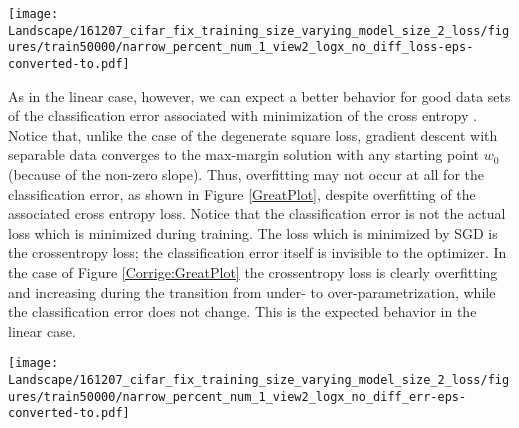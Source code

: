 \documentclass[10pt]{article}
\begin{document}
\begin{figure*}[h!]\centering
\texttt{[image: Landscape/161207\_cifar\_fix\_training\_size\_varying\_model\_size\_2\_loss/figures/train50000/narrow\_percent\_num\_1\_view2\_logx\_no\_diff\_loss-eps-converted-to.pdf]}
\caption{\it The previous figures show dependence on $n$ -- number of
  training examples -- for a fixed ReLU architecture with $W$
  parameters.  This figure shows dependence on $W$ of the
  cross entropy loss for a fixed training set of $n$ examples. The
  network is again a 5-layer all convolutional network (i.e., no
  pooling) with ReLUs. All hidden layers have the same number of
  channels. Neither data augmentation nor regularization is
  performed. SGD was used with batch size $= 100$ for $70$ epochs for
  each point. There is clear overfitting in
  the testing loss.}
\label{Corrige:GreatPlot}
\end{figure*}




As in the linear case, however, we can expect a better behavior for
good data sets of the classification error associated with
minimization of the cross entropy \cite{2017arXiv171010345S}. Notice
that, unlike the case of the degenerate square loss, gradient descent
with separable data converges to the max-margin solution with any
starting point $w_0$ (because of the non-zero slope). Thus,
overfitting may not occur at all for the classification error, as
shown in Figure \ref{GreatPlot}, despite overfitting of the associated
cross entropy loss. Notice that the classification error is not the
actual loss which is minimized during training. The loss which is
minimized by SGD is the crossentropy loss; the classification error
itself is invisible to the optimizer.  In the case of Figure
\ref{Corrige:GreatPlot} the crossentropy loss is clearly overfitting
and increasing during the transition from under- to
over-parametrization, while the classification error does not change.
This is the expected behavior in the linear case.




\begin{figure*}[h!]\centering
\texttt{[image: Landscape/161207\_cifar\_fix\_training\_size\_varying\_model\_size\_2\_loss/figures/train50000/narrow\_percent\_num\_1\_view2\_logx\_no\_diff\_err-eps-converted-to.pdf]}
\caption{\it The figure shows the classification error under the same
  conditions of Figure \ref{Corrige:GreatPlot}. The classical theory explains the generalization behavior
  on the left; the text explains the lack of overfitting for
  $W>N$.}
\label{GreatPlot}
\end{figure*}
\end{document}

